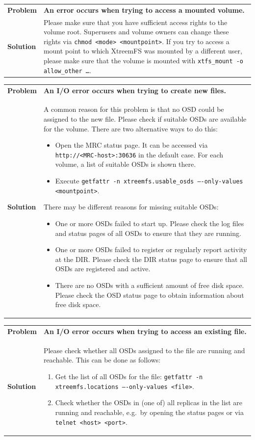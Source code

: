 \documentclass[a4paper,10pt]{book}
\begin{document}
\begin{tabular}{lp{10cm}}
 \textbf{Problem}  & \textbf{An error occurs when trying to access a mounted volume.} \\
 \textbf{Solution} & Please make sure that you have sufficient access rights to the volume root. Superusers and volume owners can change these rights via \texttt{chmod <mode> <mountpoint>}. If you try to access a mount point to which XtreemFS was mounted by a different user, please make sure that the volume is mounted with \texttt{xtfs\_mount -o allow\_other \dots}.
\end{tabular}

\begin{tabular}{lp{10cm}}
 \textbf{Problem}  & \textbf{An I/O error occurs when trying to create new files.} \\
 \textbf{Solution} & A common reason for this problem is that no OSD could be assigned to the new file. Please check if suitable OSDs are available for the volume. There are two alternative ways to do this:
   \begin{itemize}
     \item Open the MRC status page. It can be accessed via \texttt{http://<MRC-host>:30636} in the default case. For each volume, a list of suitable OSDs is shown there.
     \item Execute \texttt{getfattr -n xtreemfs.usable\_osds ----only-values <mountpoint>}.
   \end{itemize}
 There may be different reasons for missing suitable OSDs:
   \begin{itemize}
    \item One or more OSDs failed to start up. Please check the log files and status pages of all OSDs to ensure that they are running.
    \item One or more OSDs failed to register or regularly report activity at the DIR. Please check the DIR status page to ensure that all OSDs are registered and active.
    \item There are no OSDs with a sufficient amount of free disk space. Please check the OSD status page to obtain information about free disk space.
   \end{itemize}
\end{tabular}

\begin{tabular}{lp{10cm}}
 \textbf{Problem}  & \textbf{An I/O error occurs when trying to access an existing file.}\\
 \textbf{Solution} & Please check whether all OSDs assigned to the file are running and reachable. This can be done as follows:
    \begin{enumerate}
     \item Get the list of all OSDs for the file: \texttt{getfattr -n xtreemfs.locations ----only-values <file>}.
     \item Check whether the OSDs in (one of) all replicas in the list are running and reachable, e.g.\ by opening the status pages or via \texttt{telnet <host> <port>}.
    \end{enumerate}
\end{tabular}
\end{document}
